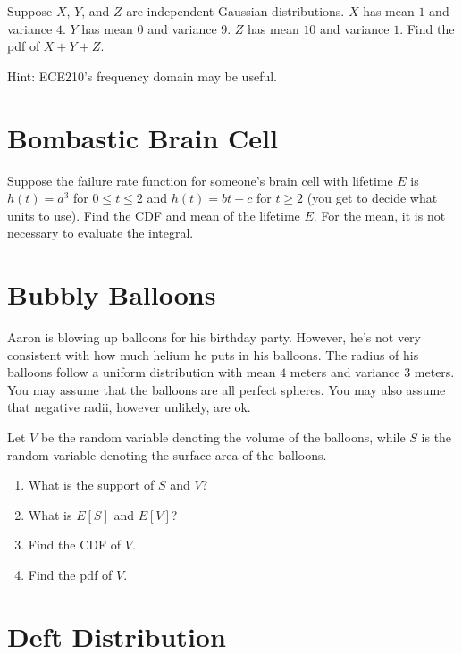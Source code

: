 \documentclass{article}
\begin{document}
Suppose $X$, $Y$, and $Z$ are independent Gaussian distributions. $X$ has mean $1$ and variance $4$. $Y$ has mean $0$ and variance $9$. $Z$ has mean $10$ and variance $1$. Find the pdf of $X + Y + Z$.

Hint: ECE210's frequency domain may be useful.

\vfill

\section{Bombastic Brain Cell}

Suppose the failure rate function for someone's brain cell with lifetime $E$ is $h(t) = a^3$ for $0 \leq t \leq 2$ and $h(t) = bt + c$ for $t \geq 2$ (you get to decide what units to use). Find the CDF and mean of the lifetime $E$. For the mean, it is not necessary to evaluate the integral.

\vfill\newpage

\section{Bubbly Balloons}

Aaron is blowing up balloons for his birthday party. However, he's not very consistent with how much helium he puts in his balloons. The radius of his balloons follow a uniform distribution with mean $4$ meters and variance $3$ meters. You may assume that the balloons are all perfect spheres. You may also assume that negative radii, however unlikely, are ok.

Let $V$ be the random variable denoting the volume of the balloons, while $S$ is the random variable denoting the surface area of the balloons.

\begin{enumerate}[label=(\alph*)]
\itemsep0em
    \item What is the support of $S$ and $V$?\vfill
    \item What is $E[S]$ and $E[V]$?\vfill
    \item Find the CDF of $V$.\vfill
    \item Find the pdf of $V$.\vfill
\end{enumerate}

\newpage

\section{Deft Distribution}
\end{document}
